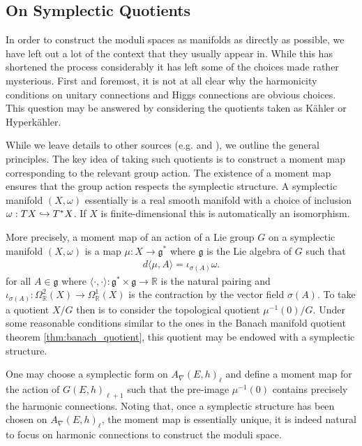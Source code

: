 \documentclass[12pt]{ociamthesis}  %
\begin{document}
\subsection{On Symplectic Quotients}\label{sec:symplectic_quotients}

In order to construct the moduli spaces as manifolds as directly as
possible, we have left out a lot of the context that they usually appear
in. While this has shortened the process considerably it has left
some of the choices made rather mysterious. First and foremost, it is
not at all clear why the harmonicity conditions on unitary connections and
Higgs connections are obvious choices. This question may be
answered by considering the quotients taken as K\"ahler or Hyperk\"ahler.

While we leave details to other sources (e.g. \cite{thomas2006} and \cite{neitzke2021}),
we outline the general principles. The key idea of taking such quotients is to
construct a moment map corresponding to the relevant group action.
The existence of a moment map ensures that the group action respects
the symplectic structure. A symplectic manifold $(X,\omega)$
essentially is a real smooth manifold with a choice of inclusion
$\omega : TX \hookrightarrow T^*X$. If $X$ is finite-dimensional this is
automatically an isomorphism.

More precisely, a moment map of an action of a Lie group $G$ on a symplectic manifold
$(X,\omega)$ is a map $\mu : X \to \mathfrak g^*$
where $\mathfrak g$ is the Lie algebra of $G$ such that
\begin{align*}
  d\langle\mu,A\rangle = \iota_{\sigma(A)}\omega.
\end{align*}
for all $A\in\mathfrak g$ where $\langle \cdot,\cdot\rangle : \mathfrak g^* \times \mathfrak g \to \mathbb R$
is the natural pairing and $\iota_{\sigma(A)} : \Omega^2_{\mathbb R}(X)\to \Omega^1_{\mathbb R}(X)$
is the contraction by the vector field $\sigma(A)$. To take a
quotient $X/G$ then is to consider the topological quotient $\mu^{-1}(0)/G$.
Under some reasonable conditions similar to the ones
in the Banach manifold quotient theorem \ref{thm:banach_quotient},
this quotient may be endowed with a symplectic structure.

One may choose a symplectic form on $A_\nabla(E,h)_\ell$ and
define a moment map for the action of $G(E,h)_{\ell+1}$ such that the
pre-image $\mu^{-1}(0)$ contains precisely the harmonic connections.
Noting that, once a symplectic structure has been chosen on $A_\nabla(E,h)_\ell$,
the moment map is essentially unique, it is indeed natural to focus on harmonic
connections to construct the moduli space.
\end{document}
